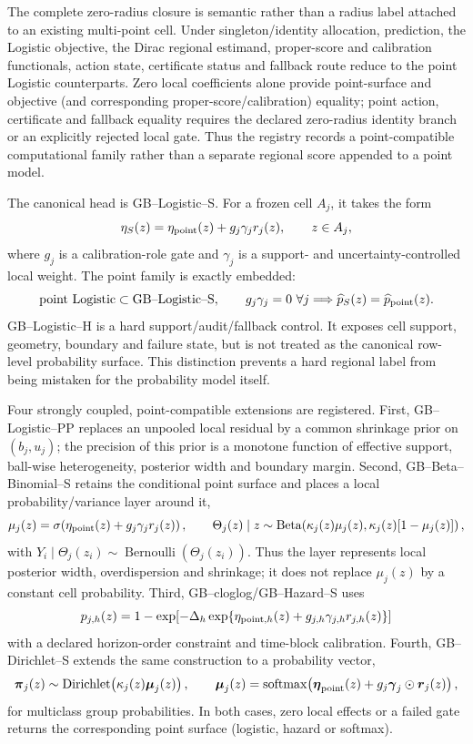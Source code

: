\documentclass[11pt,a4paper]{article}
\numberwithin{equation}{section}
\theoremstyle{definition}\newtheorem{definition}[theorem]{Definition}
\theoremstyle{remark}\newtheorem{remark}[theorem]{Remark}
\begin{document}
The complete zero-radius closure is semantic rather than a radius label attached to an existing multi-point cell. Under singleton/identity allocation, prediction, the Logistic objective, the Dirac regional estimand, proper-score and calibration functionals, action state, certificate status and fallback route reduce to the point Logistic counterparts. Zero local coefficients alone provide point-surface and objective (and corresponding proper-score/calibration) equality; point action, certificate and fallback equality requires the declared zero-radius identity branch or an explicitly rejected local gate. Thus the registry records a point-compatible computational family rather than a separate regional score appended to a point model.

The canonical head is GB--Logistic--S. For a frozen cell $A_j$, it takes the form
\[
 \eta_S(z)=\eta_{\rm point}(z)+g_j\gamma_j r_j(z),\qquad z\in A_j,
\]
where $g_j$ is a calibration-role gate and $\gamma_j$ is a support- and uncertainty-controlled local weight. The point family is exactly embedded:
\[
 \text{point Logistic}\subset\text{GB--Logistic--S},
 \qquad g_j\gamma_j=0\ \forall j\Longrightarrow\widehat p_S(z)=\widehat p_{\rm point}(z).
\]
GB--Logistic--H is a hard support/audit/fallback control. It exposes cell support, geometry, boundary and failure state, but is not treated as the canonical row-level probability surface. This distinction prevents a hard regional label from being mistaken for the probability model itself.

Four strongly coupled, point-compatible extensions are registered. First, GB--Logistic--PP replaces an unpooled local residual by a common shrinkage prior on $(b_j,u_j)$; the precision of this prior is a monotone function of effective support, ball-wise heterogeneity, posterior width and boundary margin. Second, GB--Beta--Binomial--S retains the conditional point surface and places a local probability/variance layer around it,
\[
 \mu_j(z)=\sigma\!\left(\eta_{\rm point}(z)+g_j\gamma_jr_j(z)\right),\qquad
 \Theta_j(z)\mid z\sim\operatorname{Beta}\!\left(\kappa_j(z)\mu_j(z),\kappa_j(z)[1-\mu_j(z)]\right),
\]
with $Y_i\mid\Theta_j(z_i)\sim\operatorname{Bernoulli}(\Theta_j(z_i))$. Thus the layer represents local posterior width, overdispersion and shrinkage; it does not replace $\mu_j(z)$ by a constant cell probability. Third, GB--cloglog/GB--Hazard--S uses
\[
 p_{j,h}(z)=1-\exp\!\left[-\Delta_h\exp\{\eta_{{\rm point},h}(z)+g_{j,h}\gamma_{j,h}r_{j,h}(z)\}\right]
\]
with a declared horizon-order constraint and time-block calibration. Fourth, GB--Dirichlet--S extends the same construction to a probability vector,
\[
 \boldsymbol\pi_j(z)\sim\operatorname{Dirichlet}\!\left(\kappa_j(z)\boldsymbol\mu_j(z)\right),
 \qquad \boldsymbol\mu_j(z)=\operatorname{softmax}\!\left(\boldsymbol\eta_{\rm point}(z)+g_j\boldsymbol\gamma_j\odot\boldsymbol r_j(z)\right),
\]
for multiclass group probabilities. In both cases, zero local effects or a failed gate returns the corresponding point surface (logistic, hazard or softmax).
\end{document}
